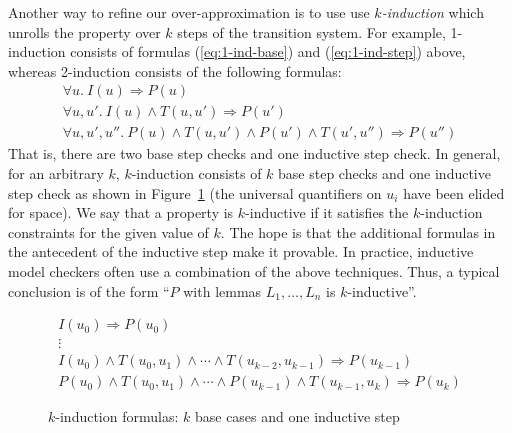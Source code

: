 Another way to refine our over-approximation is to use use {\em
  $k$-induction} which unrolls the property over $k$ steps of the
transition system. For example, 1-induction consists of formulas
(\ref{eq:1-ind-base}) and (\ref{eq:1-ind-step}) above, whereas
2-induction consists of the following formulas:
\begin{gather*}
\forall u.~ I(u) \Rightarrow P(u) \\
\forall u, u'.~ I(u) \land T(u, u') \Rightarrow P(u') \\
\forall u, u', u''.~ P(u) \land T(u, u') \land P(u') \land T(u',
  u'') \Rightarrow P(u'')
\end{gather*}
That is, there are two base step checks and one inductive step check.
In general, for an arbitrary $k$, $k$-induction consists of $k$
base step checks and one inductive step check as shown in
Figure~\ref{fig:k-induction} (the universal quantifiers on $u_i$ have
been elided for space). We say that a property is $k$-inductive if it
satisfies the $k$-induction constraints for the given value of $k$.
The hope is that the additional formulas in the antecedent of the
inductive step make it provable. 
In practice, inductive model checkers often use a combination of the
above techniques. Thus, a typical conclusion is of the form ``$P$ with
lemmas $L_1, \ldots, L_n$ is $k$-inductive''.

\begin{figure}
\begin{gather*}
I(u_0) \Rightarrow P(u_0) \\[-2pt]
%
\vdots \\[2pt]
%
I(u_0) \land T(u_0, u_1) \land \cdots \land T(u_{k-2}, u_{k-1})
\Rightarrow P(u_{k-1}) \\[2pt]
%
P(u_0) \land T(u_0, u_1) \land \cdots \land P(u_{k-1}) \land
T(u_{k-1}, u_k) \Rightarrow P(u_k)
\end{gather*}
\caption{$k$-induction formulas: $k$ base cases and one inductive
  step}
\label{fig:k-induction}
\end{figure}




